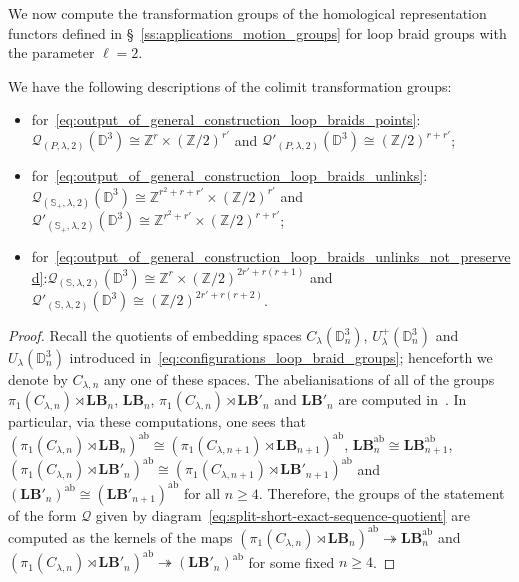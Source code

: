 \documentclass[AHL,Unicode,published]{cedram}
\newcommand{\ab}{\mathrm{ab}}
\newcommand{\lB}{\mathbf{LB}}
\newcommand{\cQ}{\mathcal{Q}}
\newcommand{\bD}{\mathbb{D}}
\newcommand{\bS}{\mathbb{S}}
\newcommand{\bZ}{\mathbb{Z}}
\renewcommand{\geq}{\geqslant}
\begin{document}
We now compute the transformation groups of the homological representation functors defined in \S~\ref{ss:applications_motion_groups} for loop braid groups with the parameter $\ell = 2$.

\begin{lemm}\label{lem:transformation_groups_ab_quotient_loop_braid_groups}
We have the following descriptions of the colimit transformation groups:
\begin{itemize}
\item for~\eqref{eq:output_of_general_construction_loop_braids_points}\textup{:} $\cQ_{(P,\lambda,2)}(\bD^{3})\cong \bZ^{r}\times (\bZ/2)^{r'}$ and $\cQ'_{(P,\lambda,2)}(\bD^{3})\cong (\bZ/2)^{r+r'}$;
\item for~\eqref{eq:output_of_general_construction_loop_braids_unlinks}\textup{:}\newline $\cQ_{(\bS_{+},\lambda,2)}(\bD^{3})\cong \bZ^{r^2+r+r'}\times (\bZ/2)^{r'}$ and $\cQ'_{(\bS_{+},\lambda,2)}(\bD^{3})\cong \bZ^{r^2+r'}\times (\bZ/2)^{r+r'}$;
\item for~\eqref{eq:output_of_general_construction_loop_braids_unlinks_not_preserved}\textup{:}\newline $\cQ_{(\bS,\lambda,2)}(\bD^{3})\cong \bZ^{r}\times (\bZ/2)^{2r'+r(r+1)}$ and $\cQ'_{(\bS,\lambda,2)}(\bD^{3})\cong (\bZ/2)^{2r'+r(r+2)}$.
\end{itemize}
\end{lemm}

\begin{proof}
Recall the quotients of embedding spaces $C_{\lambda}(\bD^{3}_{n})$, $U_{\lambda}^{+}(\bD^{3}_{n})$ and $U_{\lambda}(\bD^{3}_{n})$ introduced in~\eqref{eq:configurations_loop_braid_groups}; henceforth we denote by $C_{\lambda,n}$ any one of these spaces. The abelianisations of all of the groups $\pi_{1}(C_{\lambda,n})\rtimes\lB_{n}$, $\lB_{n}$, $\pi_{1}(C_{\lambda,n})\rtimes\lB'_{n}$ and $\lB'_{n}$ are computed in~\cite[Props.~4.46 and 5.10]{DPS}. In particular, via these computations, one sees that $(\pi_{1}(C_{\lambda,n})\rtimes\lB_{n})^{\ab}\cong (\pi_{1}(C_{\lambda,n+1})\rtimes\lB_{n+1})^{\ab}$, $\lB_{n}^{\ab}\cong \lB_{n+1}^{\ab}$, $(\pi_{1}(C_{\lambda,n})\rtimes\lB'_{n})^{\ab}\cong (\pi_{1}(C_{\lambda,n+1})\rtimes\lB'_{n+1})^{\ab}$ and $(\lB'_{n})^{\ab}\cong (\lB'_{n+1})^{\ab}$ for all $n\geq 4$. Therefore, the groups of the statement of the form $\cQ$ given by diagram~\eqref{eq:split-short-exact-sequence-quotient} are computed as the kernels of the maps $(\pi_{1}(C_{\lambda,n})\rtimes\lB_{n})^{\ab}\twoheadrightarrow \lB_{n}^{\ab}$ and $(\pi_{1}(C_{\lambda,n})\rtimes\lB'_{n})^{\ab}\twoheadrightarrow(\lB'_{n})^{\ab}$ for some fixed $n\geq 4$.
\end{proof}
\end{document}
